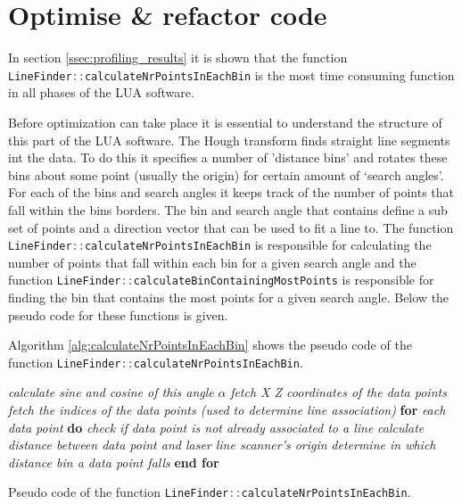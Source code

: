 \section{Optimise \& refactor code} \label{sec:optimize}
In section \ref{ssec:profiling_results} it is shown that the function \lstinline[language=c]|LineFinder::calculateNrPointsInEachBin| is the most time consuming function in all phases of the LUA software.

Before optimization can take place it is essential to understand the structure of this part of the LUA software. The Hough transform finds straight line segments int the data. To do this it specifies a number of 'distance bins' and rotates these bins about some point (usually the origin) for certain amount of `search angles'. For each of the bins and search angles it keeps track of the number of points that fall within the bins borders. The bin and search angle that contains define a sub set of points and a direction vector that can be used to fit a line to. The function \lstinline[language=c]|LineFinder::calculateNrPointsInEachBin| is responsible for calculating the number of points that fall within each bin for a given search angle and the function \lstinline[language=c]|LineFinder::calculateBinContainingMostPoints| is responsible for finding the bin that contains the most points for a given search angle. Below the pseudo code for these functions is given.

Algorithm \ref{alg:calculateNrPointsInEachBin} shows the pseudo code of the function \lstinline[language=c]|LineFinder::calculateNrPointsInEachBin|.

\begin{algorithm}
    \begin{algorithmic}[1]
        \State \textit{calculate sine and cosine of this angle} $\alpha$
        \State \textit{fetch X Z coordinates of the data points}
        \State \textit{fetch the indices of the data points (used to determine line association)}
        \State \textbf{for} \textit{each data point} \textbf{do}
        \State \hspace{1cm} \textit{check if data point is not already associated to a line}
        \State \hspace{1cm} \textit{calculate distance between data point and laser line scanner's origin}
        \State \hspace{1cm} \textit{determine in which distance bin a data point falls}
        \State \textbf{end for}
        \EndFunction
    \end{algorithmic}
    \caption{Pseudo code of the function \lstinline[language=c]|LineFinder::calculateNrPointsInEachBin|.}
    \label{alg:calculateNrPointsInEachBin}
\end{algorithm}

